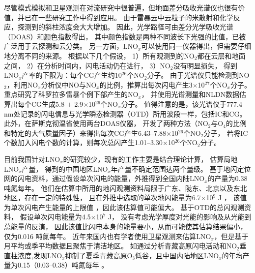 尽管模式模拟和卫星观测在对流研究中很普遍，但地面差分吸收光谱仪也很有价值，并已在一些研究工作中得到应用。
由于雷暴云中云粒子的米散射和化学反应，探测到的斜柱浓度会大大增加\citep{Erle.1995,Pfeilsticker.1998,Winterrath.1999}。
因此，光学路径可由差分光学吸收光谱（DOAS）和颜色指数得出\citep{Veitel.1998,Wagner.1998}，
其中颜色指数是两种不同波长下光强的比值，已被广泛用于云探测和云分类\citep{Wagner.2014,Wang.2015,Wagner.2016}。
另一方面，LNO$_x$可以使用同一仪器得出，但需要仔细地分离不同的来源。
\citet{Noxon.1976}根据以下几个假设，
1）所有观测到的NO$_2$都在云层和地面之间，
2）在分析时间内，闪电活动仍在进行，
3）NO$_2$没有明显损失，
得到LNO$_x$产率的下限为：每个CG产生约10$^{26}$个NO$_2$分子。
由于光谱仪只能检测到NO$_2$，\citet{Franzblau.1989}利用NO$_x$分析仪中NO与NO$_x$的比例，推算出每次闪电产生3$\times$10$^{27}$个NO$_x$分子。
\citet{Langford.2004}重点研究了科罗拉多雷暴个例下部产生的NO$_x$，
并使用光谱测量和NLDN数据估算出每个CG生成5.8 $\pm$ 2.9$\times$10$^{26}$个NO$_x$分子。
值得注意的是，该光谱仪于777.4 nm处记录的闪电信息与光学瞬态检测器（OTD）所用波段一样，包括IC和CG。
此外，\citet{Fraser.2007}在萨斯克彻温省使用两台DOAS仪器，
开发了两种方法（NO$_2$与O$_4$的比例和特定的大气质量因子）来得出每次CG产生6.43--7.88$\times$10$^{26}$个NO$_2$分子，
若将IC个数加入闪电个数的计算，则每次总闪产生1.01--3.30$\times$10$^{26}$个NO$_2$分子。

目前我国针对LNO$_x$的研究较少，现有的工作主要是结合理论计算，
估算局地LNO$_x$产量\citep{DuJian.2002,ZhangYiJun.2002,ZhouYunJun.2002}，
得到的中国地区LNO$_x$年产量不确定范围达两个量级。
\citet{ZhouYunJun.2004}基于地闪定位网的闪电资料，通过假设单次闪电的能量，外推得到全国内陆LNO$_x$的产量为0.38 吨氮每年。
他们在估算中所用的地闪观测资料局限于广东、陇东、北京以及东北地区，存在一定的特殊性，
且在外推中选取的单次地闪能量为6.7$\times$10$^9$ J \citep{Price.1997a,Price.1997b}，
该值为单次闪电产生能量的上限值 \citep{Wang.1998}，因此该估算值可能偏大。
\citet{SunAnPing.2004}基于OTD的总闪观测资料，
假设单次闪电能量为4.5$\times$10$^7$ J，
没有考虑光学厚度对光能的影响及从光能到总能量的反演，
因此该值比闪电本身的能量要小，从而可能使其估算结果偏小，仅为0.016 吨氮每年。
近年来国内也有学者使用卫星观测来估算LNO$_x$，但是基于月平均或季平均数据且聚焦于清洁地区。
如通过分析青藏高原闪电活动和NO$_2$垂直柱浓度,发现LNO$_x$抑制了夏季青藏高原O$_3$低谷，且中国内陆地区LNO$_x$的年均产量为0.15（0.03--0.38）吨氮每年 \citep{JuXiaoYu.2015,Guo.2017,GuoFengXia.2019,Li.2022}。


